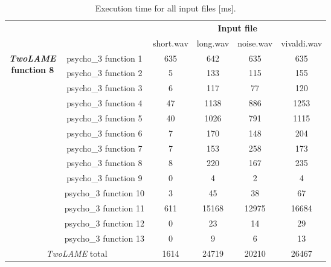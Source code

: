 \documentclass{article}
\begin{document}
\begin{table}[H]
    \centering
    \begin{tabular}{|c|c|c|c|c|c|}
    \cline{3-6}
    \multicolumn{2}{c|}{}  & \multicolumn{4}{c|}{\textbf{Input file}} \\
    \cline{3-6}
    \multicolumn{2}{c|}{} & short.wav & long.wav & noise.wav & vivaldi.wav \\
    \cline{1-6}
   \multirow{13}{*}{\parbox{2.3cm}{\centering \textbf{\textit{TwoLAME}} \\ \textbf{function 8}}}  & \multicolumn{1}{c|}{psycho\_3 function 1}  & 635 & 642 & 635 & 635 \\ 
    \cline{2-6}
    & \multicolumn{1}{c|}{psycho\_3 function 2} & 5 & 133 & 115 & 155 \\ 
    \cline{2-6}
    & \multicolumn{1}{c|}{psycho\_3 function 3} &  6 &  117& 77 &  120 \\ 
    \cline{2-6}
    & \multicolumn{1}{c|}{psycho\_3 function 4} & 47 & 1138 & 886 &  1253  \\ 
    \cline{2-6}
    & \multicolumn{1}{c|}{psycho\_3 function 5} & 40  & 1026 & 791 &  1115  \\ 
    \cline{2-6}
    & \multicolumn{1}{c|}{psycho\_3 function 6} &  7 & 170 & 148 & 204  \\ 
    \cline{2-6}
     & \multicolumn{1}{c|}{psycho\_3 function 7} &  7 & 153 & 258 & 173  \\ 
    \cline{2-6}
    & \multicolumn{1}{c|}{psycho\_3 function 8} & 8 & 220 & 167 & 235  \\ 
    \cline{2-6}
    & \multicolumn{1}{c|}{psycho\_3 function 9} &  0 & 4 & 2 & 4  \\ 
    \cline{2-6}
    & \multicolumn{1}{c|}{psycho\_3 function 10} & 3 & 45 & 38 & 67   \\
    \cline{2-6}
    & \multicolumn{1}{c|}{psycho\_3 function 11} & 611 & 15168  & 12975 &  16684 \\
    \cline{2-6}
    & \multicolumn{1}{c|}{psycho\_3 function 12} & 0 & 23 & 14 & 29  \\ 
    \cline{2-6}
    & \multicolumn{1}{c|}{psycho\_3 function 13} & 0 & 9 & 6 & 13  \\ 
    \hline
    \multicolumn{2}{|c|}{\textit{TwoLAME} total}  & 1614 & 24719 & 20210 & 26467 \\ 
    \hline
    \end{tabular}
    \caption{Execution time for all input files [ms].}
    \label{profiling3}
\end{table}
\end{document}
